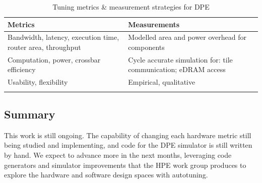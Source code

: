 \begin{table}[htpb]
\centering
\begin{tabular}{@{}p{}p{}@{}}
\toprule
\textbf{Metrics} & \textbf{Measurements} \\ \midrule
Bandwidth, latency, execution time, router area, throughput & Modelled area and power overhead for components \\
\addlinespace
Computation, power, crossbar efficiency & Cycle accurate simulation for: tile communication; eDRAM access \\
\addlinespace
Usability, flexibility & Empirical, qualitative \\ \bottomrule
\addlinespace
\end{tabular}
\caption{Tuning metrics \& measurement strategies for DPE}
\label{tab:metrics-measurements}
\end{table}


\subsection{Summary}
\label{subsec:DPEconcl}

This work is still ongoing. The capability of changing each hardware metric
still being studied and implementing, and code for the DPE simulator is still
written by hand. We expect to advance more in the next months, leveraging code
generators and simulator improvements that the HPE work group produces to
explore the hardware and software design spaces with autotuning.
